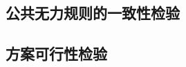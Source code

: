 \documentclass[bwprint,fontset=windows]{gmcmthesis}
\begin{document}
\subsection{公共无力规则的一致性检验}


\subsection{方案可行性检验}





\cite{mittelbach_latex_2004,wright_latex3_2009,beeton_unicode_2008,vieth_experiences_2009}



\end{document}
